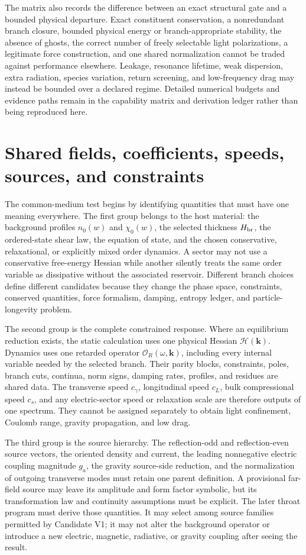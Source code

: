 The matrix also records the difference between an exact structural gate and a
bounded physical departure. Exact constituent conservation, a nonredundant
branch closure, bounded physical energy or branch-appropriate stability, the
absence of ghosts, the correct number of freely selectable light polarizations,
a legitimate force construction, and one shared normalization cannot be traded
against performance elsewhere. Leakage, resonance lifetime, weak dispersion,
extra radiation, species variation, return screening, and low-frequency drag
may instead be bounded over a declared regime. Detailed numerical budgets and
evidence paths remain in the capability matrix and derivation ledger rather
than being reproduced here.

\section{Shared fields, coefficients, speeds, sources, and constraints}

The common-medium test begins by identifying quantities that must have one
meaning everywhere. The first group belongs to the host material: the
background profiles \(n_0(w)\) and \(\chi_0(w)\), the selected thickness
\(H_{\rm br}\), the ordered-state shear law, the equation of state, and the
chosen conservative, relaxational, or explicitly mixed order dynamics. A sector
may not use a conservative free-energy Hessian while another silently treats the
same order variable as dissipative without the associated reservoir. Different
branch choices define different candidates because they change the phase space,
constraints, conserved quantities, force formalism, damping, entropy ledger,
and particle-longevity problem.

The second group is the complete constrained response. Where an equilibrium
reduction exists, the static calculation uses one physical Hessian
\(\mathcal H(\mathbf k)\). Dynamics uses one retarded operator
\(\mathcal O_R(\omega,\mathbf k)\), including every internal variable needed by
the selected branch. Their parity blocks, constraints, poles, branch cuts,
continua, norm signs, damping rates, profiles, and residues are shared data. The
transverse speed \(c_\gamma\), longitudinal speed \(c_L\), bulk compressional
speed \(c_s\), and any electric-sector speed or relaxation scale are therefore
outputs of one spectrum. They cannot be assigned separately to obtain light
confinement, Coulomb range, gravity propagation, and low drag.

The third group is the source hierarchy. The reflection-odd and
reflection-even source vectors, the oriented density and current, the leading
nonnegative electric coupling magnitude \(g_a\), the gravity source-side
reduction, and the normalization of outgoing transverse modes must retain one
parent definition. A provisional far-field source may leave its amplitude and
form factor symbolic, but its transformation law and continuity assumptions
must be explicit. The later throat program must derive those quantities. It may
select among source families permitted by Candidate V1; it may not alter the
background operator or introduce a new electric, magnetic, radiative, or
gravity coupling after seeing the result.

